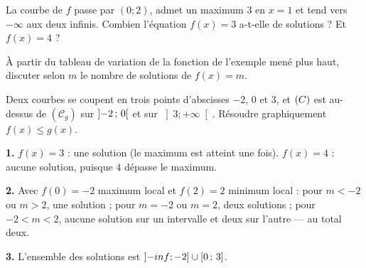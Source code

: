 \begin{entrainement}
\exo[\niveau{1}] La courbe de $f$ passe par $(0;2)$, admet un maximum $3$ en
$x=1$ et tend vers $-\infty$ aux deux infinis. Combien l'équation
$f(x) = 3$ a-t-elle de solutions ? Et $f(x) = 4$ ?

\exo[\niveau{2}] À partir du tableau de variation de la fonction de l'exemple
mené plus haut, discuter selon $m$ le nombre de solutions de $f(x) = m$.

\exo[\niveau{2}] Deux courbes se coupent en trois points d'abscisses $-2$, $0$
et $3$, et $(C)$ est au-dessus de $(\mathscr{C}_{g})$ sur
$\left]-2\,;\,0\right[$ et sur $\left]3 ; +\infty\right[$. Résoudre
graphiquement $f(x) \leq g(x)$.
\end{entrainement}

\begin{corrige}
\textbf{1.} $f(x)=3$ : une solution (le maximum est atteint une fois).
$f(x)=4$ : aucune solution, puisque $4$ dépasse le maximum.

\textbf{2.} Avec $f(0) = -2$ maximum local et $f(2) = 2$ minimum local :
pour $m < -2$ ou $m > 2$, une solution ; pour $m = -2$ ou $m = 2$, deux
solutions ; pour $-2 < m < 2$, aucune solution sur un intervalle et deux sur
l'autre — au total deux.

\textbf{3.} L'ensemble des solutions est
$\left]-inf ; -2\right] \cup \left[0\,;\,3\right]$.
\end{corrige}

